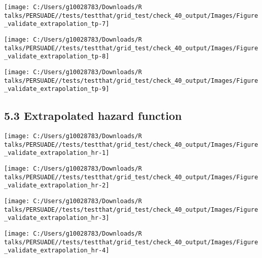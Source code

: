 \documentclass[
]{article}
\begin{document}
\begin{flushleft}\texttt{[image: C:/Users/g10028783/Downloads/R talks/PERSUADE//tests/testthat/grid\_test/check\_40\_output/Images/Figure\_validate\_extrapolation\_tp-7]} \end{flushleft}

\begin{flushleft}\texttt{[image: C:/Users/g10028783/Downloads/R talks/PERSUADE//tests/testthat/grid\_test/check\_40\_output/Images/Figure\_validate\_extrapolation\_tp-8]} \end{flushleft}

\begin{flushleft}\texttt{[image: C:/Users/g10028783/Downloads/R talks/PERSUADE//tests/testthat/grid\_test/check\_40\_output/Images/Figure\_validate\_extrapolation\_tp-9]} \end{flushleft}

\clearpage

\subsection{5.3 Extrapolated hazard
function}\label{extrapolated-hazard-function}

\begin{flushleft}\texttt{[image: C:/Users/g10028783/Downloads/R talks/PERSUADE//tests/testthat/grid\_test/check\_40\_output/Images/Figure\_validate\_extrapolation\_hr-1]} \end{flushleft}

\begin{flushleft}\texttt{[image: C:/Users/g10028783/Downloads/R talks/PERSUADE//tests/testthat/grid\_test/check\_40\_output/Images/Figure\_validate\_extrapolation\_hr-2]} \end{flushleft}

\begin{flushleft}\texttt{[image: C:/Users/g10028783/Downloads/R talks/PERSUADE//tests/testthat/grid\_test/check\_40\_output/Images/Figure\_validate\_extrapolation\_hr-3]} \end{flushleft}

\begin{flushleft}\texttt{[image: C:/Users/g10028783/Downloads/R talks/PERSUADE//tests/testthat/grid\_test/check\_40\_output/Images/Figure\_validate\_extrapolation\_hr-4]} \end{flushleft}
\end{document}
